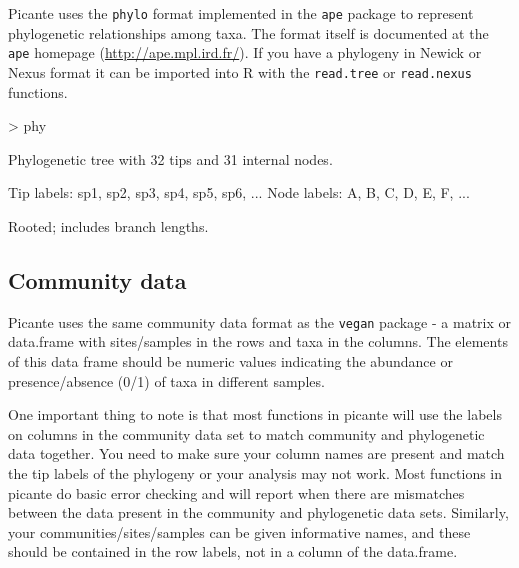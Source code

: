 \documentclass[12pt]{article}
\begin{document}
Picante uses the \texttt{phylo} format implemented in the \texttt{ape} package to represent phylogenetic relationships among taxa. The format itself is documented at the \texttt{ape} homepage (\url{http://ape.mpl.ird.fr/}). If you have a phylogeny in Newick or Nexus format it can be imported into R with the \texttt{read.tree} or \texttt{read.nexus} functions.

\begin{Schunk}
\begin{Sinput}
> phy
\end{Sinput}
\begin{Soutput}
Phylogenetic tree with 32 tips and 31 internal nodes.

Tip labels:
  sp1, sp2, sp3, sp4, sp5, sp6, ...
Node labels:
  A, B, C, D, E, F, ...

Rooted; includes branch lengths.
\end{Soutput}
\end{Schunk}

\subsection{Community data}

Picante uses the same community data format as the \texttt{vegan} package - a matrix or data.frame with sites/samples in the rows and taxa in the columns. The elements of this data frame should be numeric values indicating the abundance or presence/absence (0/1) of taxa in different samples.

One important thing to note is that most functions in picante will use the labels on columns in the community data set to match community and phylogenetic data together. You need to make sure your column names are present and match the tip labels of the phylogeny or your analysis may not work. Most functions in picante do basic error checking and will report when there are mismatches between the data present in the community and phylogenetic data sets. Similarly, your communities/sites/samples can be given informative names, and these should be contained in the row labels, not in a column of the data.frame.
\end{document}
